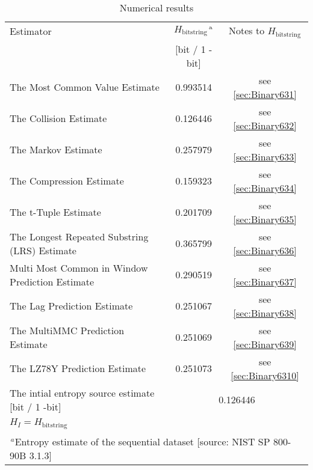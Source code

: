 \documentclass[a3paper,xelatex,english]{bxjsarticle}
\begin{document}
\begin{table}[h]
\caption{Numerical results}
\begin{center}
\begin{tabular}{|l|c|c|}
\hline 
\rowcolor{anotherlightblue} %
Estimator										& $H_{\textrm{bitstring}}$$^{\textrm{\,a}}$ & Notes to $H_{\textrm{bitstring}}$	\\ 
\cline{2-3}
\rowcolor{anotherlightblue} %
\,												& [bit / 1 - bit] & \,		\\
\hline 
The Most Common Value Estimate					& 0.993514& see \ref{sec:Binary631} \\
\hline 
The Collision Estimate							& 0.126446& see \ref{sec:Binary632} \\
\hline 
The Markov Estimate								& 0.257979& see \ref{sec:Binary633} \\
\hline 
The Compression Estimate						& 0.159323& see \ref{sec:Binary634} \\
\hline 
The t-Tuple Estimate							& 0.201709& see \ref{sec:Binary635} \\
\hline 
The Longest Repeated Substring (LRS) Estimate	& 0.365799& see \ref{sec:Binary636} \\
\hline 
Multi Most Common in Window Prediction Estimate	& 0.290519& see \ref{sec:Binary637} \\
\hline 
The Lag Prediction Estimate						& 0.251067& see \ref{sec:Binary638} \\
\hline 
The MultiMMC Prediction Estimate				& 0.251069& see \ref{sec:Binary639} \\
\hline 
The LZ78Y Prediction Estimate					& 0.251073& see \ref{sec:Binary6310} \\
\hline \hline 
The intial entropy source estimate [bit / 1 -bit]	& \multicolumn{2}{|c|}{0.126446}	\\
$H_{I} = H_{\textrm{bitstring}}$ & \multicolumn{2}{|c|}{ \, } 	\\
\hline \hline 
\multicolumn{3}{|l|}{$^{\,a}$\quad Entropy estimate of the sequential dataset [source: NIST SP 800-90B \cite{SP80090B} 3.1.3]} \\
\hline 
\end{tabular}
\end{center}
\end{table}
\end{document}
